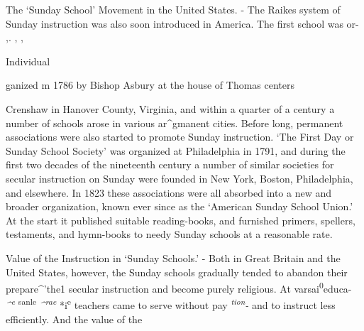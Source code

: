 \documentclass[
]{book}
\begin{document}
The `Sunday School' Movement in the United States. - The Raikes system of Sunday instruction was also soon introduced in America. The first school was or- ,. , ,

Individual

ganized m 1786 by Bishop Asbury at the house of Thomas centers

Crenshaw in Hanover County, Virginia, and within a quarter of a century a number of schools arose in various ar\^{}gmanent cities. Before long, permanent associations were also started to promote Sunday instruction. `The First Day or Sunday School Society' was organized at Philadelphia in 1791, and during the first two decades of the nineteenth century a number of similar societies for secular instruction on Sunday were founded in New York, Boston, Philadelphia, and elsewhere. In 1823 these associations were all absorbed into a new and broader organization, known ever since as the `American Sunday School Union.' At the start it published suitable reading-books, and furnished primers, spellers, testaments, and hymn-books to needy Sunday schools at a reasonable rate.

Value of the Instruction in `Sunday Schools.' - Both in Great Britain and the United States, however, the Sunday schools gradually tended to abandon their prepare\^{}'the1 secular instruction and become purely religious. At varsai\textsuperscript{0}educa- \emph{\^{}\textsuperscript{e}} \textsuperscript{sanle} \emph{\^{}\textsuperscript{rae}} *i\textsuperscript{e} teachers came to serve without pay \emph{\textsuperscript{tion}-} and to instruct less efficiently. And the value of the
\end{document}
